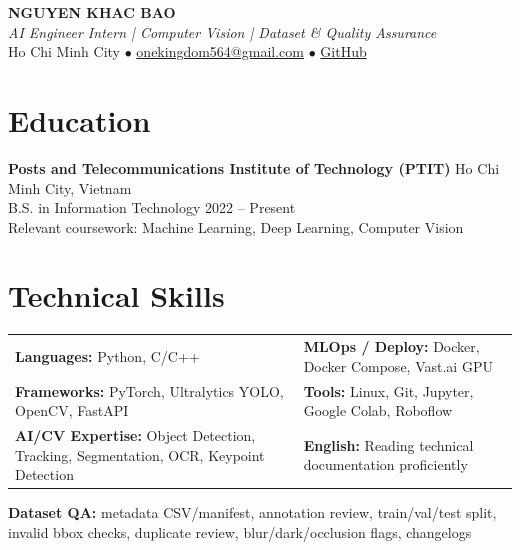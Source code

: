 \documentclass[10pt,a4paper]{article}
\begin{document}
\begin{center}
  {\LARGE\color{heading}\textbf{NGUYEN KHAC BAO}}\\
  \vspace{2pt}
  {\color{accent}\textit{AI Engineer Intern \quad | \quad Computer Vision \quad | \quad Dataset \& Quality Assurance}}\\
  \vspace{2pt}
  Ho Chi Minh City \quad $\bullet$ \quad
  \href{mailto:onekingdom564@gmail.com}{onekingdom564@gmail.com} \quad $\bullet$ \quad
  \href{https://github.com/NguyenKhacBao564}{GitHub}
\end{center}

\section{Education}
\textbf{Posts and Telecommunications Institute of Technology (PTIT)} \hfill Ho Chi Minh City, Vietnam\\
B.S. in Information Technology \hfill 2022 -- Present\\
Relevant coursework: Machine Learning, Deep Learning, Computer Vision

\section{Technical Skills}
\begin{tabularx}{\textwidth}{@{}X X@{}}
\textbf{Languages:} Python, C/C++ & \textbf{MLOps / Deploy:} Docker, Docker Compose, Vast.ai GPU \\
\textbf{Frameworks:} PyTorch, Ultralytics YOLO, OpenCV, FastAPI & \textbf{Tools:} Linux, Git, Jupyter, Google Colab, Roboflow \\
\textbf{AI/CV Expertise:} Object Detection, Tracking, Segmentation, OCR, Keypoint Detection & \textbf{English:} Reading technical documentation proficiently \\
\end{tabularx}
\vspace{2pt}

\textbf{Dataset QA:} metadata CSV/manifest, annotation review, train/val/test split, invalid bbox checks, duplicate review, blur/dark/occlusion flags, changelogs
\end{document}
